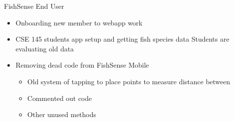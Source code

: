 
\begin{frame}{FishSense End User}
    \begin{itemize}
        \item Onboarding new member to webapp work
        \item CSE 145 students app setup and getting fish species data
        \itme Students are evaluating old data
        \item Removing dead code from FishSense Mobile 
        \begin{itemize}
            \item Old system of tapping to place points to measure distance between
            \item Commented out code
            \item Other unused methods
        \end{itemize}   
    \end{itemize}    
\end{frame}



